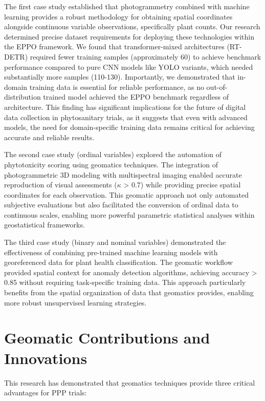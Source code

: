 \documentclass[12pt,a4paper,oneside]{report}
\begin{document}
The first case study established that photogrammetry combined with machine learning 
provides a robust methodology for obtaining spatial coordinates alongside continuous 
variable observations, specifically plant counts. Our research determined precise 
dataset requirements for deploying these technologies within the EPPO framework. 
We found that transformer-mixed architectures (RT-DETR) required fewer training samples 
(approximately 60) to achieve benchmark performance compared to pure CNN models like YOLO 
variants, which needed substantially more samples (110-130). Importantly, we demonstrated that in-domain training 
data is essential for reliable performance, as no out-of-distribution trained model 
achieved the EPPO benchmark regardless of architecture. This finding has significant 
implications for the future of digital data collection in phytosanitary trials, as it
suggests that even with advanced models, the need for domain-specific training data
remains critical for achieving accurate and reliable results.

The second case study (ordinal variables) explored the automation of phytotoxicity scoring using geomatics techniques. The integration of photogrammetric 3D modeling with multispectral imaging enabled accurate reproduction of visual assessments ($\kappa$ > 0.7) while providing precise spatial coordinates for each observation. This geomatic approach not only automated subjective evaluations but also facilitated the conversion of ordinal data to continuous scales, enabling more powerful parametric statistical analyses within geostatistical frameworks.

The third case study (binary and nominal variables) demonstrated the effectiveness of combining pre-trained machine learning models with georeferenced data for plant health classification. The geomatic workflow provided spatial context for anomaly detection algorithms, achieving accuracy > 0.85 without requiring task-specific training data. This approach particularly benefits from the spatial organization of data that geomatics provides, enabling more robust unsupervised learning strategies.

\section{Geomatic Contributions and Innovations}

This research has demonstrated that geomatics techniques provide three critical advantages for PPP trials:
\end{document}
